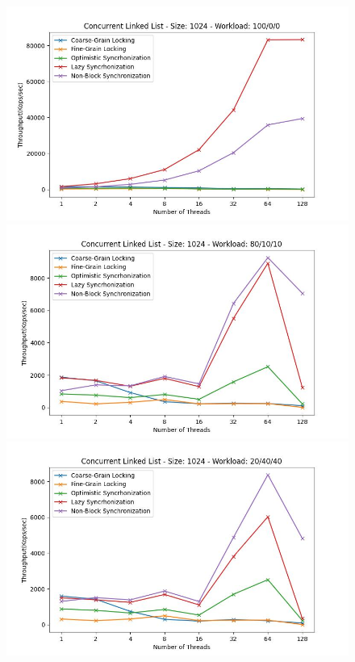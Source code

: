 \documentclass[../final_report.tex]{subfiles}
\begin{document}
\begin{figure}[H]
    \centering
        \includegraphics[scale=0.4]{outFiles/plots/concurrent_data_structs_all_1024_100_0_0.jpg}
        \includegraphics[scale=0.4]{outFiles/plots/concurrent_data_structs_all_1024_80_10_10.jpg}
        \includegraphics[scale=0.4]{outFiles/plots/concurrent_data_structs_all_1024_20_40_40.jpg}

\end{figure}
\end{document}
